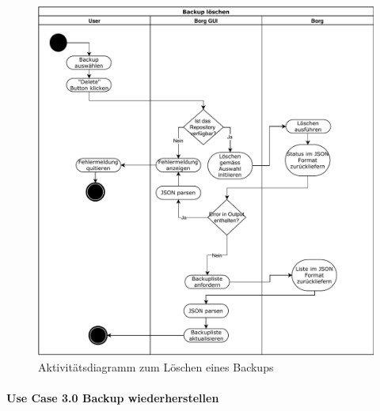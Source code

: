 \begin{figure}[htbp]
\centering
\includegraphics[width=.9\linewidth]{pictures/activity_delete.pdf}
\caption{\label{fig:org288e5d3}
Aktivitätsdiagramm zum Löschen eines Backups}
\end{figure}
\newpage
\paragraph{Use Case 3.0 Backup wiederherstellen}
\label{sec:org8be05c9}

